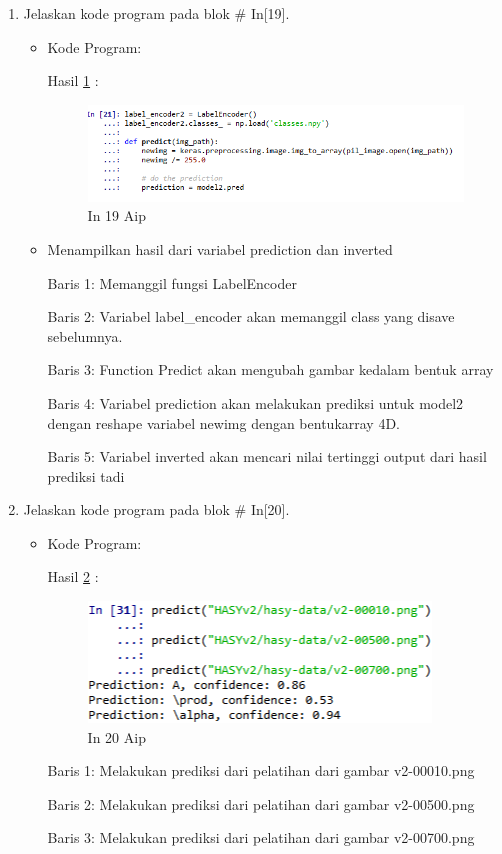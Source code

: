 \begin{enumerate}
\item Jelaskan kode program pada blok \# In[19].
\begin{itemize}
\item Kode Program:

\par Hasil \ref{in19aip} :
\begin{figure}[!hbtp]
\centering
\includegraphics[scale=0.7]{figures/AIP/prak19.PNG}
\caption{In 19 Aip}
\label{in19aip}
\end{figure}
\item Menampilkan hasil dari variabel prediction dan inverted
\par Baris 1: Memanggil fungsi LabelEncoder
\par Baris 2: Variabel label\_encoder akan memanggil class yang disave sebelumnya.
\par Baris 3: Function Predict akan mengubah gambar kedalam bentuk array
\par Baris 4: Variabel prediction akan melakukan prediksi untuk model2 dengan reshape variabel newimg dengan bentukarray 4D.
\par Baris 5: Variabel inverted akan mencari nilai tertinggi output dari hasil prediksi tadi
\end{itemize}
\par

\item Jelaskan kode program pada blok \# In[20].
\begin{itemize}
\item Kode Program:

\par Hasil \ref{in20aip} :
\begin{figure}[!hbtp]
\centering
\includegraphics[scale=0.7]{figures/AIP/prak20.PNG}
\caption{In 20 Aip}
\label{in20aip}
\end{figure}
\par Baris 1: Melakukan prediksi dari pelatihan dari gambar v2-00010.png
\par Baris 2: Melakukan prediksi dari pelatihan dari gambar v2-00500.png
\par Baris 3: Melakukan prediksi dari pelatihan dari gambar v2-00700.png 
\end{itemize}
\par


\end{enumerate}
